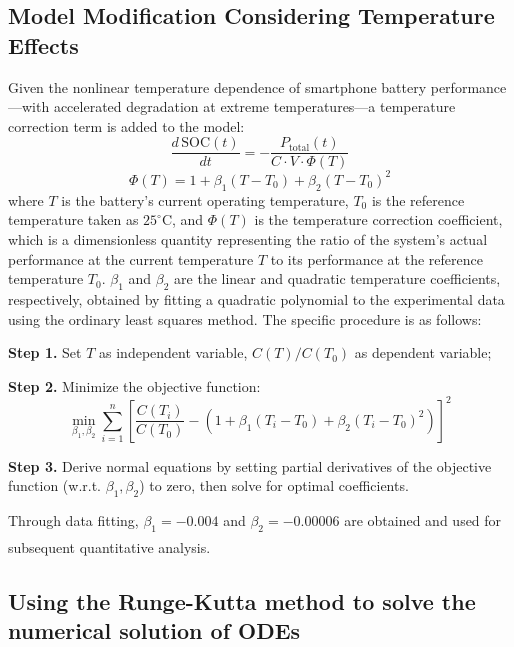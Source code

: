 \documentclass{mcmthesis}  %
\newcommand{\upcite}[1]{\textsuperscript{\textsuperscript{\cite{#1}}}}
\begin{document}
		\subsection{Model Modification Considering Temperature Effects}
		
		Given the nonlinear temperature dependence of smartphone battery performance—with accelerated degradation at extreme temperatures—a temperature correction term is added to the model:
		\begin{equation}
			\frac{d\,\text{SOC}(t)}{dt} = -\frac{P_{\text{total}}(t)}{C \cdot V \cdot \Phi(T)}
		\end{equation}
		\begin{equation}
			\Phi(T) = 1 + \beta_1(T - T_0) + \beta_2(T - T_0)^2
		\end{equation}
		where $T$ is the battery's current operating temperature, $T_0$ is the reference temperature taken as $25^\circ\text{C}$, and $\Phi(T)$ is the temperature correction coefficient, which is a dimensionless quantity representing the ratio of the system's actual performance at the current temperature $T$ to its performance at the reference temperature $T_0$. $\beta_1$ and $\beta_2$ are the linear and quadratic temperature coefficients, respectively, obtained by fitting a quadratic polynomial to the experimental data using the ordinary least squares method. The specific procedure is as follows:
		
		\textbf{Step 1.} Set $T$ as independent variable, $C(T)/C(T_0)$ as dependent variable;
		
		\textbf{Step 2.} Minimize the objective function:
		\begin{equation}
			\min_{\beta_1,\beta_2} \sum_{i=1}^{n} \left[ \frac{C(T_i)}{C(T_0)} - \left(1 + \beta_1(T_i - T_0) + \beta_2(T_i - T_0)^2\right) \right]^2
		\end{equation}
			
		\textbf{Step 3.} Derive normal equations by setting partial derivatives of the objective function (w.r.t. $\beta_1, \beta_2$) to zero, then solve for optimal coefficients.
		
		Through data fitting, $\beta_1=-0.004$ and $\beta_2=-0.00006$ are obtained and used for subsequent quantitative analysis\upcite{7}.
	
	\subsection{Using the Runge-Kutta method to solve the numerical solution of ODEs}
	
\end{document}
